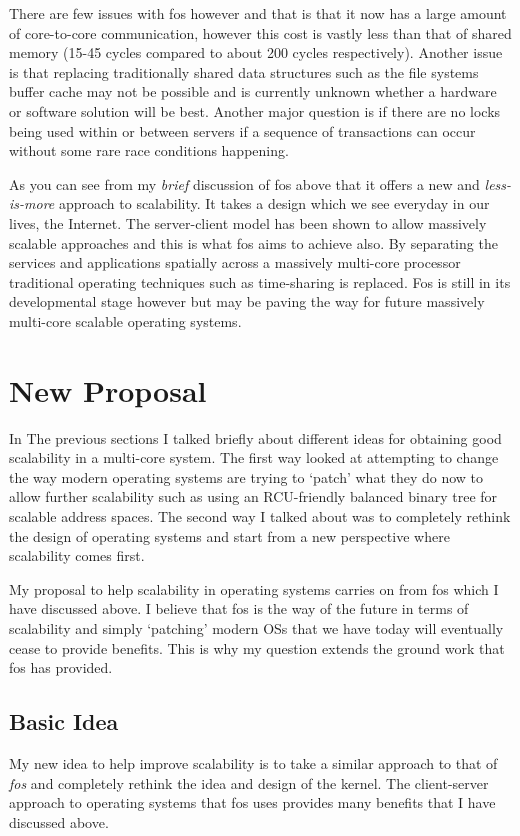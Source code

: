 \documentclass[journal]{IEEEtran}
\begin{document}
There are few issues with fos however and that is that it now has a large amount of core-to-core communication, however this cost is vastly less than that of shared memory (15-45 cycles compared to about 200 cycles respectively). Another issue is that replacing traditionally shared data structures such as the file systems buffer cache may not be possible and is currently unknown whether a hardware or software solution will be best. Another major question is if there are no locks being used within or between servers if a sequence of transactions can occur without some rare race conditions happening.

As you can see from my \emph{brief} discussion of fos above that it offers a new and \emph{less-is-more} approach to scalability. It takes a design which we see everyday in our lives, the Internet. The server-client model has been shown to allow massively scalable approaches and this is what fos aims to achieve also. By separating the services and applications spatially across a massively multi-core processor traditional operating techniques such as time-sharing is replaced. Fos is still in its developmental stage however but may be paving the way for future massively multi-core scalable operating systems.

\section{New Proposal}

In The previous sections I talked briefly about different ideas for obtaining good scalability in a multi-core system. The first way looked at attempting to change the way modern operating systems are trying to `patch' what they do now to allow further scalability such as using an RCU-friendly balanced binary tree for scalable address spaces. The second way I talked about was to completely rethink the design of operating systems and start from a new perspective where scalability comes first. 

My proposal to help scalability in operating systems carries on from fos which I have discussed above. I believe that fos is the way of the future in terms of scalability and simply `patching' modern OSs that we have today will eventually cease to provide benefits. This is why my question extends the ground work that fos has provided.

\subsection{Basic Idea}
My new idea to help improve scalability is to take a similar approach to that of \emph{fos} \cite{fos} and completely rethink the idea and design of the kernel. The client-server approach to operating systems that fos uses provides many benefits that I have discussed above. 
\end{document}
